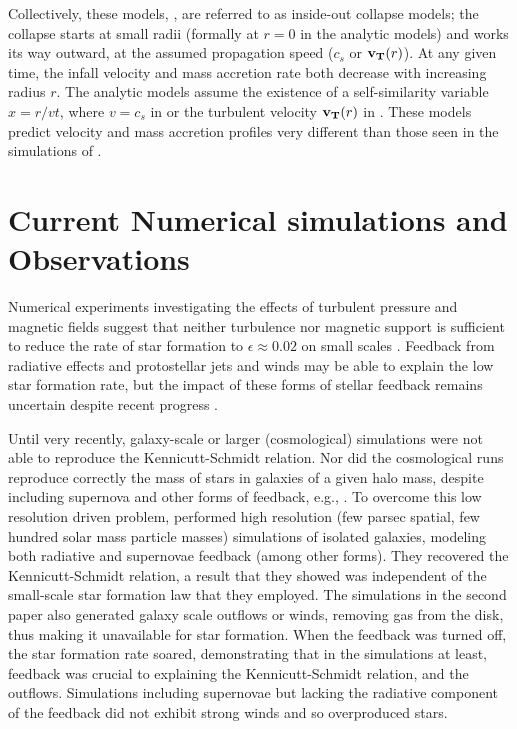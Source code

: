 \documentclass[../dissertation.tex]{subfiles}
\begin{document}
Collectively, these models, \citep{1977ApJ...214..488S,1992ApJ...396..631M,1997ApJ...476..750M,2003ApJ...585..850M}, 
are referred to as inside-out collapse models; the collapse starts at small radii (formally at $r=0$ in the analytic models) 
and works its way outward, at the assumed propagation speed ($c_s$ or $\mathbf{v_T} (r)$). 
At any given time, the infall velocity and mass accretion rate both decrease with increasing radius $r$. 
The analytic models assume the existence of a self-similarity variable $x = r/vt$, where $v=c_s$ in 
\citet{1977ApJ...214..488S} or the turbulent velocity $\mathbf{v_T} (r)$ in \citet{1992ApJ...396..631M,1997ApJ...476..750M,2003ApJ...585..850M}.  
These models predict velocity and mass accretion profiles very different than those seen 
in the simulations of \citet{2015ApJ...800...49L}.

\section{Current Numerical simulations and Observations} \label{current_obs}
Numerical experiments investigating the effects of turbulent pressure and magnetic fields suggest that neither turbulence nor magnetic support is sufficient 
to reduce the rate of star formation to $\epsilon\approx 0.02$ on small scales
\citep{2010ApJ...709...27W,2011MNRAS.410L...8C,2011ApJ...730...40P,2012ApJ...754...71K,2014MNRAS.439.3420M}. 
Feedback from radiative effects and protostellar jets and winds may be able to explain the low star formation rate, 
but the impact of these forms of stellar feedback remains uncertain despite recent progress
\citep{2010ApJ...709...27W,2014MNRAS.439.3420M,2015MNRAS.450.4035F}.

Until very recently, galaxy-scale or larger (cosmological) simulations 
were not able to reproduce the Kennicutt-Schmidt relation. 
Nor did the cosmological runs reproduce correctly the mass of stars in galaxies of a given 
halo mass, despite including supernova and other forms of feedback, 
e.g., \citet{2010MNRAS.404.1111G,2010Natur.463..203G,2011MNRAS.410.2625P}.
To overcome this low resolution driven problem, \citet{2011MNRAS.417..950H,2012MNRAS.421.3522H}
performed high resolution (few parsec spatial, few hundred solar mass particle masses) simulations 
of isolated galaxies, modeling both radiative and supernovae feedback (among other forms). 
They recovered the Kennicutt-Schmidt relation, a result that they 
showed was independent of the small-scale star formation
law that they employed. 
The simulations in the second paper also generated galaxy 
scale outflows or winds, removing gas from the disk, thus making it unavailable for star 
formation. 
When the feedback was turned off, the star formation rate soared, demonstrating that
in the simulations at least, feedback was crucial to explaining the Kennicutt-Schmidt relation, and
the outflows. 
Simulations including supernovae but lacking the radiative component of the feedback
did not exhibit strong winds and so overproduced stars.
\end{document}

